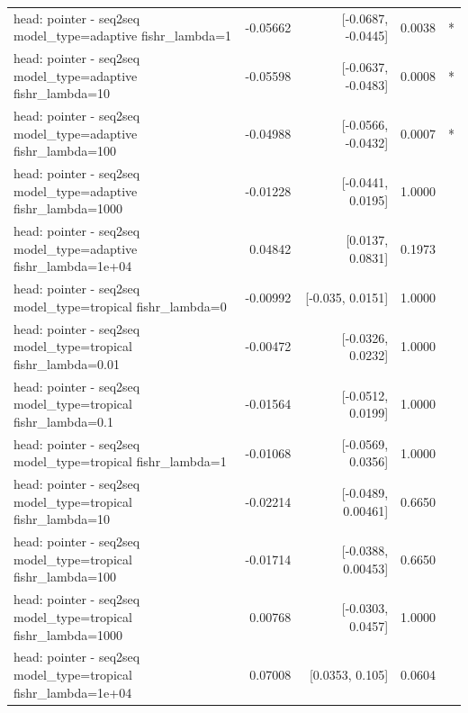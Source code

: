 \documentclass[10pt]{article}
\makeatletter
\newcommand{\stackcell}[1]{\begin{tabular}[t]{@{}l@{}}#1\end{tabular}}
\makeatother
\begin{document}
{\begin{longtable}{lrrrl}
\stackcell{head: pointer - seq2seq\\\footnotesize model\_type=adaptive fishr\_lambda=1 } & -0.05662 & [-0.0687, -0.0445] & 0.0038 & *\\
\stackcell{head: pointer - seq2seq\\\footnotesize model\_type=adaptive fishr\_lambda=10 } & -0.05598 & [-0.0637, -0.0483] & 0.0008 & *\\
\stackcell{head: pointer - seq2seq\\\footnotesize model\_type=adaptive fishr\_lambda=100 } & -0.04988 & [-0.0566, -0.0432] & 0.0007 & *\\
\stackcell{head: pointer - seq2seq\\\footnotesize model\_type=adaptive fishr\_lambda=1000 } & -0.01228 & [-0.0441, 0.0195] & 1.0000 & \\
\stackcell{head: pointer - seq2seq\\\footnotesize model\_type=adaptive fishr\_lambda=1e+04 } & 0.04842 & [0.0137, 0.0831] & 0.1973 & \\
\stackcell{head: pointer - seq2seq\\\footnotesize model\_type=tropical fishr\_lambda=0 } & -0.00992 & [-0.035, 0.0151] & 1.0000 & \\
\stackcell{head: pointer - seq2seq\\\footnotesize model\_type=tropical fishr\_lambda=0.01 } & -0.00472 & [-0.0326, 0.0232] & 1.0000 & \\
\stackcell{head: pointer - seq2seq\\\footnotesize model\_type=tropical fishr\_lambda=0.1 } & -0.01564 & [-0.0512, 0.0199] & 1.0000 & \\
\stackcell{head: pointer - seq2seq\\\footnotesize model\_type=tropical fishr\_lambda=1 } & -0.01068 & [-0.0569, 0.0356] & 1.0000 & \\
\stackcell{head: pointer - seq2seq\\\footnotesize model\_type=tropical fishr\_lambda=10 } & -0.02214 & [-0.0489, 0.00461] & 0.6650 & \\
\stackcell{head: pointer - seq2seq\\\footnotesize model\_type=tropical fishr\_lambda=100 } & -0.01714 & [-0.0388, 0.00453] & 0.6650 & \\
\stackcell{head: pointer - seq2seq\\\footnotesize model\_type=tropical fishr\_lambda=1000 } & 0.00768 & [-0.0303, 0.0457] & 1.0000 & \\
\stackcell{head: pointer - seq2seq\\\footnotesize model\_type=tropical fishr\_lambda=1e+04 } & 0.07008 & [0.0353, 0.105] & 0.0604 & \\

\end{longtable}}
\end{document}
